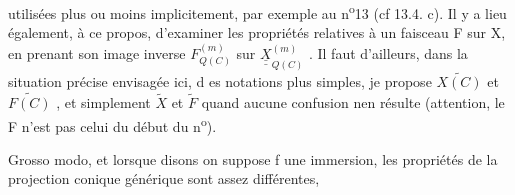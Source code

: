 utilisées plus ou moins implicitement,  par exemple au n\textsuperscript{o}13 
 (cf 13.4. c). Il y a lieu également, à ce propos, d'examiner les
propriétés relatives à un faisceau F sur X,  en prenant son image inverse
$F^{(m)}_{Q(C)}$  sur  $\underline{\underline{X}}^{(m)}_{Q(C)}$ . Il faut  d'ailleurs, dans la situation précise
envisagée ici, d es notations plus simples, je propose  $\widetilde{X(C)}$ et $\widetilde{F(C)}$ ,
et simplement $\widetilde{X}$ et $\widetilde{F}$  quand aucune confusion nen résulte  (attention, le
F   n'est pas  celui du début du n\textsuperscript{o}).

Grosso modo, et lorsque  disons on suppose  f une immersion, les
propriétés de la projection conique générique sont assez différentes,


